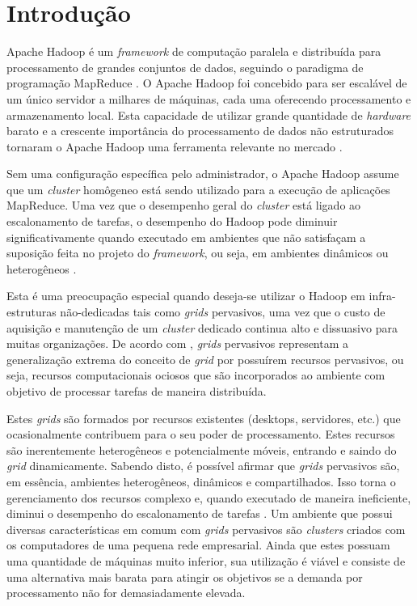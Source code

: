 \chapter{Introdução}
\label{chap:Intro}
Apache Hadoop é um \textit{framework} de computação paralela e distribuída para processamento de grandes conjuntos de dados, seguindo o paradigma de programação \mbox{MapReduce} \cite{Dean2008}. O Apache Hadoop foi concebido para ser escalável de um único servidor a milhares de máquinas, cada uma oferecendo processamento e armazenamento local. Esta capacidade de utilizar grande quantidade de \textit{hardware} barato e a crescente importância do processamento de dados não estruturados tornaram o Apache Hadoop uma ferramenta relevante no mercado \cite{Su}.

%
%

Sem uma configuração específica pelo administrador, o Apache Hadoop assume que um \textit{cluster} homôgeneo está sendo utilizado para a execução de aplicações MapReduce. Uma vez que o desempenho geral do \textit{cluster} está ligado ao escalonamento de tarefas, o desempenho do Hadoop pode diminuir significativamente quando executado em ambientes que não satisfaçam a suposição feita no projeto do \textit{framework}, ou seja, em ambientes dinâmicos ou heterogêneos \cite{Kumar2012}.

Esta é uma preocupação especial quando deseja-se utilizar o Hadoop em infra-estruturas não-dedicadas tais como \emph{grids} pervasivos, uma vez que o custo de aquisição e manutenção de um \textit{cluster} dedicado continua alto e dissuasivo para muitas organizações. De acordo com \citet{Parashar2010}, \emph{grids} pervasivos representam a generalização  extrema do conceito de \emph{grid} por possuírem recursos pervasivos, ou seja, recursos computacionais ociosos que são incorporados ao ambiente com objetivo de processar tarefas de maneira distribuída. 

Estes \emph{grids} são formados por recursos existentes (desktops, servidores, etc.) que ocasionalmente contribuem para o seu poder de processamento. Estes recursos são inerentemente heterogêneos e potencialmente móveis, entrando e saindo do \emph{grid} dinamicamente. Sabendo disto, é possível afirmar que \emph{grids} pervasivos são, em essência, ambientes heterogêneos, dinâmicos e compartilhados. Isso torna o gerenciamento dos recursos complexo e, quando executado de maneira ineficiente, diminui  o desempenho do escalonamento de tarefas \cite{Nascimento}. Um ambiente que possui diversas características em comum com \emph{grids} pervasivos são \textit{clusters} criados com os computadores de uma pequena rede empresarial. Ainda que estes possuam uma quantidade de máquinas muito inferior, sua utilização é viável e consiste de uma alternativa mais barata para atingir os objetivos se a demanda por processamento não for demasiadamente elevada.

